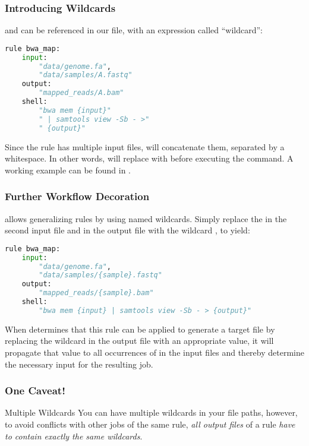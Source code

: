 \begin{frame}[fragile]
  \frametitle{Introducing Wildcards}
   and  can be referenced in our file, with an expression called ``wildcard'':
  \begin{lstlisting}[language=Python,style=Python]
rule bwa_map:
    input:
        "data/genome.fa",
        "data/samples/A.fastq"
    output:
        "mapped_reads/A.bam"
    shell:
        "bwa mem {input}"
        " | samtools view -Sb - >"
        " {output}"
    \end{lstlisting}
    Since the rule has multiple input files, \Snakemake{} will concatenate them, separated by a whitespace. In other words, \Snakemake{} will replace  with  before executing the command.\newline
    A working example can be found in .
\end{frame}

\begin{frame}[fragile]
  \frametitle{Further Workflow Decoration}\footnotesize 
  \Snakemake{} allows generalizing rules by using named wildcards. Simply replace the  in the second input file and in the output file with the wildcard , to yield:
  \begin{lstlisting}[language=Python,style=Python,basicstyle=\footnotesize]
rule bwa_map:
    input:
        "data/genome.fa",
        "data/samples/{sample}.fastq"
    output:
        "mapped_reads/{sample}.bam"
    shell:
        "bwa mem {input} | samtools view -Sb - > {output}"
  \end{lstlisting}
  When \Snakemake{} determines that this rule can be applied to generate a target file by replacing the wildcard  in the output file with an appropriate value, it will propagate that value to all occurrences of  in the input files and thereby determine the necessary input for the resulting job. 
\end{frame}

\begin{frame}
  \frametitle{One Caveat!}
  \begin{alertblock}{Multiple Wildcards}
    You can have multiple wildcards in your file paths, however, to avoid conflicts with other jobs of the same rule, \emph{all output files} of a rule \emph{have to contain exactly the same wildcards}.
  \end{alertblock}
\end{frame}


